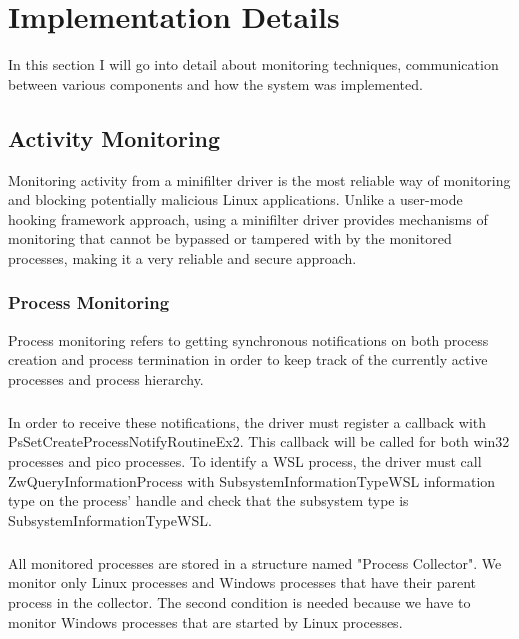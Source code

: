 \chapter{Implementation Details}
    In this section I will go into detail about monitoring techniques, communication between various components and how the system was
    implemented.

    \section{Activity Monitoring}

    Monitoring activity from a minifilter driver is the most reliable way of monitoring and blocking potentially malicious Linux applications.
    Unlike a user-mode hooking framework approach, using a minifilter driver provides mechanisms of monitoring that cannot be bypassed or tampered
    with by the monitored processes, making it a very reliable and secure approach.

    \subsection{Process Monitoring}
        Process monitoring refers to getting synchronous notifications on both process creation and process termination in order to keep track
        of the currently active processes and process hierarchy.

        \paragraph{}
        In order to receive these notifications, the driver must register a callback with PsSetCreateProcessNotifyRoutineEx2. This callback will
        be called for both win32 processes and pico processes. To identify a WSL process, the driver must call ZwQueryInformationProcess with
        SubsystemInformationTypeWSL information type on the process' handle and check that the subsystem type is SubsystemInformationTypeWSL.

        \paragraph{}
        All monitored processes are stored in a structure named "Process Collector". We monitor only Linux processes and Windows processes that
        have their parent process in the collector. The second condition is needed because we have to monitor Windows processes that are started
        by Linux processes.

